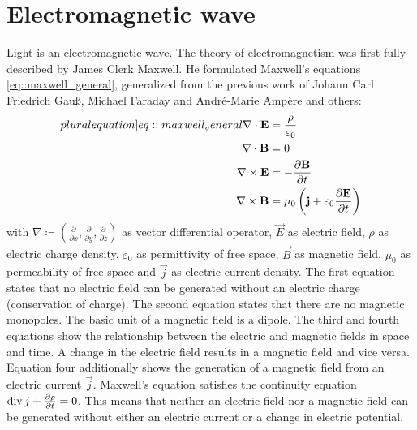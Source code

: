 \section{Electromagnetic wave}
%
Light is an electromagnetic wave.
The theory of electromagnetism was first fully described by James Clerk Maxwell.
He formulated Maxwell's equations \cref{eq::maxwell_general}, generalized from the previous work of Johann Carl Friedrich Gau{\ss}, Michael Faraday and Andr\'{e}-Marie Amp\`{e}re and others:
%
\begin{align}
\begin{split} \label[pluralequation]{eq::maxwell_general}
    \nabla \cdot \vec{E} &= \frac {\rho} {\varepsilon_0}\\
    \nabla \cdot \vec{B} &= 0\\
    \nabla \times \vec{E} &= -\frac{\partial \vec{B}} {\partial t}\\
    \nabla \times \vec{B} &= \mu_0 \left( \vec{j} + \varepsilon_0 \frac{\partial \vec{E}} {\partial t} \right)
\end{split}
\end{align}
%
with $\nabla \coloneqq \left({\frac{\partial}{\partial x}}, {\frac{\partial}{\partial y}}, {\frac{\partial}{\partial z}} \right)$ as vector differential operator, $\vec{E}$ as electric field, $\rho$ as electric charge density, $\varepsilon_0$ as permittivity of free space, $\vec{B}$ as magnetic field, $\mu_0$ as permeability of free space and $\vec{j}$ as electric current density.
%
The first equation states that no electric field can be generated without an electric charge (conservation of charge).
The second equation states that there are no magnetic monopoles.
The basic unit of a magnetic field is a dipole.
The third and fourth equations show the relationship between the electric and magnetic fields in space and time.
A change in the electric field results in a magnetic field and vice versa.
Equation four additionally shows the generation of a magnetic field from an electric current $\vec{j}$.
Maxwell's equation satisfies the continuity equation $\operatorname{div} j + \frac{\partial \rho}{\partial t} = 0$.
This means that neither an electric field nor a magnetic field can be generated without either an electric current or a change in electric potential.
%
%

